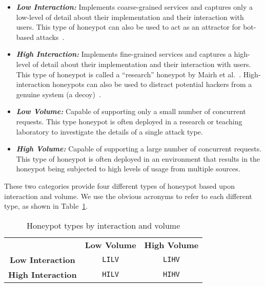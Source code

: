 \documentclass{ieeeaccess}
\begin{document}
\begin{itemize}

  \item \noindent \textit{\textbf{Low Interaction:}} Implements coarse-grained
    services and captures only a low-level of detail about their implementation
    and their interaction with users.  This type of honeypot can also be used
    to act as an attractor for bot-based attacks~\cite{SZB:16}.  

  \item \noindent \textit{\textbf{High Interaction:}} Implements fine-grained
    services and captures a high-level of detail about their implementation and
    their interaction with users.  This type of honeypot is called a
    ``research'' honeypot by Mairh et al.~\cite{MBVJ:11}. High-interaction
    honeypots can also be used to distract potential hackers from a genuine
    system (a decoy)~\cite{M:06,SNKA:12}.

\end{itemize}


\begin{itemize}

  \item \noindent \textit{\textbf{Low Volume:}} Capable of supporting only a
    small number of concurrent requests.  This type honeypot is often deployed
    in a research or teaching laboratory to investigate the details of a single
    attack type.

  \item \noindent \textit{\textbf{High Volume:}} Capable of supporting a large
    number of concurrent requests. This type of honeypot is often deployed in
    an environment that results in the honeypot being subjected to high levels
    of usage from multiple sources. 

\end{itemize}

These two categories provide four different types of honeypot based upon
interaction and volume. We use the obvious acronyms to refer to each different
type, as shown in Table~\ref{table:HoneypotTypes}.

\begin{table}[ht]
\caption{Honeypot types by interaction and volume\label{table:HoneypotTypes}}
\begin{center}
\setlength\doublerulesep{0.5pt}
\begin{tabular}{| c || c| c |}
\hline
 & \textbf{Low Volume} & \textbf{High Volume} \\
\hhline{|=||=|=|}
\textbf{Low Interaction} & \texttt{LILV} & \texttt{LIHV} \\
\hline
\textbf{High Interaction} & \texttt{HILV} & \texttt{HIHV} \\
\hline
\end{tabular}
\end{center}
\end{table}
\end{document}
